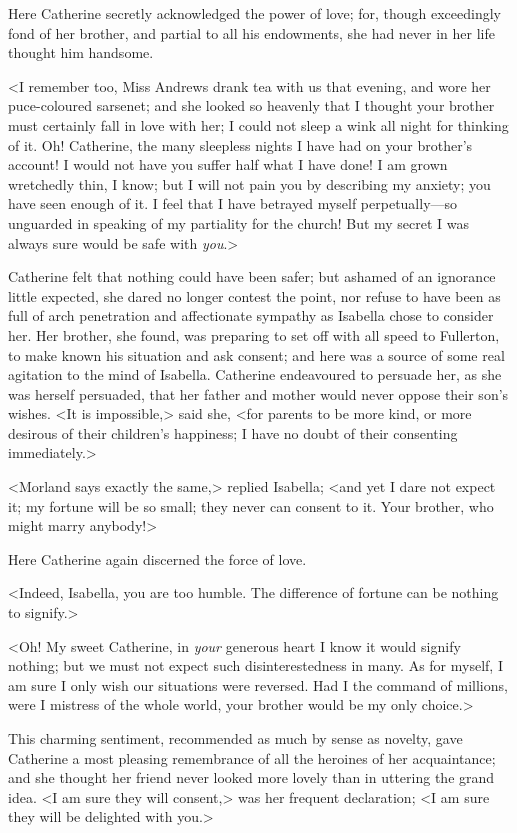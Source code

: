  Here Catherine secretly acknowledged the power of love; for, though exceedingly fond of her brother, and partial to all his endowments, she had never in her life thought him handsome. 

 <I remember too, Miss Andrews drank tea with us that evening, and wore her puce-coloured sarsenet; and she looked so heavenly that I thought your brother must certainly fall in love with her; I could not sleep a wink all night for thinking of it. Oh! Catherine, the many sleepless nights I have had on your brother's account! I would not have you suffer half what I have done! I am grown wretchedly thin, I know; but I will not pain you by describing my anxiety; you have seen enough of it. I feel that I have betrayed myself perpetually—so unguarded in speaking of my partiality for the church! But my secret I was always sure would be safe with \textit{you}.> 

 Catherine felt that nothing could have been safer; but ashamed of an ignorance little expected, she dared no longer contest the point, nor refuse to have been as full of arch penetration and affectionate sympathy as Isabella chose to consider her. Her brother, she found, was preparing to set off with all speed to Fullerton, to make known his situation and ask consent; and here was a source of some real agitation to the mind of Isabella. Catherine endeavoured to persuade her, as she was herself persuaded, that her father and mother would never oppose their son's wishes. <It is impossible,> said she, <for parents to be more kind, or more desirous of their children's happiness; I have no doubt of their consenting immediately.> 

 <Morland says exactly the same,> replied Isabella; <and yet I dare not expect it; my fortune will be so small; they never can consent to it. Your brother, who might marry anybody!> 

 Here Catherine again discerned the force of love. 

 <Indeed, Isabella, you are too humble. The difference of fortune can be nothing to signify.> 

 <Oh! My sweet Catherine, in \textit{your} generous heart I know it would signify nothing; but we must not expect such disinterestedness in many. As for myself, I am sure I only wish our situations were reversed. Had I the command of millions, were I mistress of the whole world, your brother would be my only choice.> 

 This charming sentiment, recommended as much by sense as novelty, gave Catherine a most pleasing remembrance of all the heroines of her acquaintance; and she thought her friend never looked more lovely than in uttering the grand idea. <I am sure they will consent,> was her frequent declaration; <I am sure they will be delighted with you.> 

